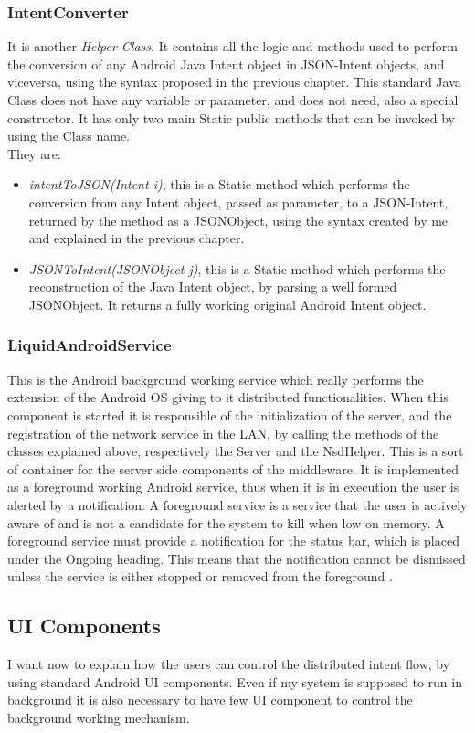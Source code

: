 \subsubsection{IntentConverter}
It is another \textit{Helper Class}. It contains all the logic and methods used to perform the conversion of any Android Java Intent object in JSON-Intent objects, and viceversa, using the syntax proposed in the previous chapter. This standard Java Class does not have any variable or parameter, and does not need, also a special constructor. It has only two main Static public methods that can be invoked by using the Class name. \\They are:
\begin{itemize}
	\item \textit{intentToJSON(Intent i)}, this is a Static method which performs the conversion from any Intent object, passed as parameter, to a JSON-Intent, returned by the method as a JSONObject, using the syntax created by me and explained in the previous chapter.
	\item \textit{JSONToIntent(JSONObject j)}, this is a Static method which performs the reconstruction of the Java Intent object, by parsing a well formed JSONObject. It returns a fully working original Android Intent object.
\end{itemize}
\subsubsection{LiquidAndroidService}
This is the Android background working service which really performs the extension of the Android OS giving to it distributed functionalities. When this component is started it is responsible of the initialization of the server, and the registration of the network service in the LAN, by calling the methods of the classes explained above, respectively the Server and the NsdHelper. This is a sort of container for the server side components of the middleware. It is implemented as a foreground working Android service, thus when it is in execution the user is alerted by a notification. A foreground service is a service that the user is actively aware of and is not a candidate for the system to kill when low on memory. A foreground service must provide a notification for the status bar, which is placed under the Ongoing heading. This means that the notification cannot be dismissed unless the service is either stopped or removed from the foreground \cite{devandroidrunning}.
\subsection{UI Components}
I want now to explain how the users can control the distributed intent flow, by using standard Android UI components. Even if my system is supposed to run in background it is also necessary to have few UI component to control the background working mechanism.
